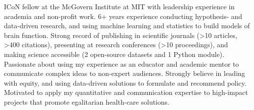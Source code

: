 

\begin{cvparagraph}

ICoN fellow at the McGovern Institute at MIT with leadership experience in academia and non-profit work. 6+ years experience conducting hypothesis- and data-driven research, and using machine learning and statistics to build models of brain function. Strong record of publishing in scientific journals (>10 articles, >400 citations), presenting at research conferences (>10 proceedings), and making science accessible (2 open-source datasets and 1 Python module). Passionate about using my experience as an educator and academic mentor to communicate complex ideas to non-expert audiences. Strongly believe in leading with equity, and using data-driven solutions to formulate and recommend policy. Motivated to apply my quantitative and communication expertise to high-impact projects that promote egalitarian health-care solutions. 

\end{cvparagraph}
